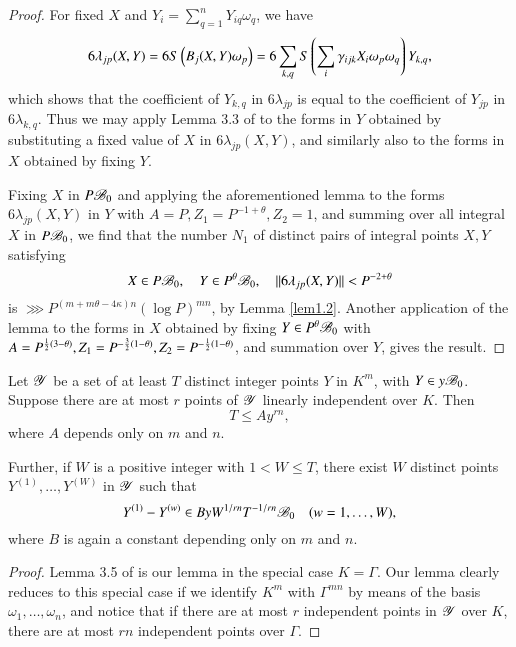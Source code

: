 \begin{proof}
For fixed $X$ and $Y_i=\sum\limits_{q=1}^nY_{iq}\omega_q$, we have 
$$
6\lambda_{jp}(X,Y)=6S\left({B_j(X,Y)\omega_p}\right)=6\sum\limits_{k,q}S 
\left({\sum\limits_i\gamma_{ijk}X_i\omega_p\omega_q}\right)Y_{k,q},
$$
which shows that the coefficient of $Y_{k,q}$ in $6\lambda_{jp}$ is 
equal to the coefficient of $Y_{jp}$ in $6\lambda_{k,q}$. Thus we may 
apply Lemma 3.3 of \cite{key3} to the forms in $Y$ obtained by 
substituting a fixed value of $X$ in $6\lambda_{jp}(X,Y)$, and 
similarly also to the forms in $X$ obtained by fixing $Y$.

Fixing $X$ in $P\mathscr{B}_0$ and applying the aforementioned lemma to the 
forms $6\lambda_{jp}(X,Y)$ in $Y$ with $A=P, Z_1=P^{-1+\theta}, 
Z_2=1$, and summing over all integral $X$ in $P\mathscr{B}_0$, we find that 
the number $N_1$ of distinct pairs of integral points $X,Y$ satisfying 
$$
X\in P\mathscr{B}_0,\quad Y\in P^\theta\mathscr{B}_0,\quad ||6\lambda_{jp}(X,Y)||< 
P^{-2+\theta}
$$
is $\ggg P^{(m+m\theta-4\kappa)n}(\log P)^{mn}$, by Lemma \ref{lem1.2}. 
Another application of the lemma to the forms in $X$ obtained by 
fixing $Y\in P^\theta\mathscr{B}_0$ with $A=P^{\frac{1}{2}(3-\theta)},\\ Z_1= 
P^{-\frac{3}{2}(1-\theta)}, Z_2=P^{-\frac{1}{2}(1-\theta)}$, and 
summation over $Y$, gives the result.
\end{proof}

\begin{lemma}\label{lem1.4}
Let $\mathscr{Y}$ be a set of at least $T$ distinct integer points $Y$ in 
$K^m$, with $Y\in  y\mathscr{B}_0$. Suppose there are at most $r$ points of 
$\mathscr{Y}$ linearly independent over $K$. Then
$$
T\leq Ay^{rn},
$$
where $A$ depends only on $m$ and $n$.

Further, if $W$ is a positive integer with $1<W\leq T$, there exist 
$W$ distinct points $Y^{(1)},\ldots,Y^{(W)}$ in $\mathscr{Y}$ such that 
$$
Y^{(1)}-Y^{(w)}\in By W^{1/rn}T^{-1/rn}\mathscr{B}_0\quad (w=1,\ldots, W),
$$
where $B$ is again a constant depending only on $m$ and $n$.
\end{lemma}

\begin{proof}
Lemma 3.5 of \cite{key3} is our lemma in the special case $K=\Gamma$. 
Our lemma clearly reduces to this special case if we identify $K^m$ 
with $\Gamma^{mn}$ by means of the basis $\omega_1,\ldots,\omega_n$, 
and notice that if there are at most $r$ independent points in $\mathscr{Y}$ 
over $K$, there  are at most $rn$ independent points over $\Gamma$.
\end{proof}

